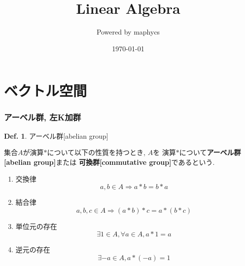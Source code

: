 \documentclass[a4paper,10pt,report]{amsart}
\title{Linear Algebra}
\author{Powered by maphycs}
\date{\today}
\theoremstyle{plain}
\theoremstyle{definition}
\newtheorem{defn}{Def.}[section]
\theoremstyle{remark}
\begin{document}
    \maketitle
    \tableofcontents
\part{ベクトル空間}
\section{アーベル群, 左K加群}
\begin{leftbar}
    \begin{defn}アーベル群[abelian group]\par
    集合\(A\)が演算\(*\)について以下の性質を持つとき, \(A\)を
    演算\(*\)について\textbf{アーベル群[abelian group]}または
    \textbf{可換群[commutative group]}であるという. 
    \begin{enumerate}
        \item 交換律
        \begin{equation*}
            a, b\in A\Rightarrow a*b=b*a
        \end{equation*}
        \item 結合律
        \begin{equation*}
            a, b, c\in A\Rightarrow(a*b)*c=a*(b*c)
        \end{equation*}
        \item 単位元の存在
        \begin{equation*}
            \exists 1\in A, \forall a\in A, a*1=a
        \end{equation*}
        \item 逆元の存在
        \begin{equation*}
            \exists -a\in A,a*(-a)=1
        \end{equation*}
    \end{enumerate}
    \end{defn}
\end{leftbar}
\end{document}

